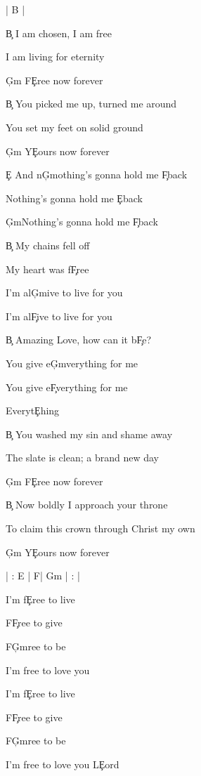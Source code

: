 \documentclass[9pt]{extarticle}
\begin{document}
\bsong

\bi
| B |
\ei

\bv
\c{B} I am chosen, I am free

I am living for eternity

\c{G\s m} F\c{E}ree now forever
\ev

\bv
\c{B} You picked me up, turned me around

You set my feet on solid ground

\c{G\s m} Y\c{E}ours now forever
\ev

\bp
\c{E} And n\c{G\s m}othing's gonna hold me \c{F\s }back

Nothing's gonna hold me \c{E}back

\c{G\s m}Nothing's gonna hold me \c{F\s }back
\ep

\bc
\c{B} My chains fell off

My heart was f\c{F\s }ree

I'm al\c{G\s m}ive to live for you

I'm al\c{F\s }ive to live for you



\c{B} Amazing Love, how can it b\c{F\s }e?

You give e\c{G\s m}verything for me

You give e\c{F\s }verything for me

Everyt\c{E}hing
\ec

\bv
\c{B} You washed my sin and shame away

The slate is clean; a brand new day

\c{G\s m} F\c{E}ree now forever
\ev

\bv
\c{B} Now boldly I approach your throne

To claim this crown through Christ my own

\c{G\s m} Y\c{E}ours now forever
\ev



\bin
| : E | F\s  | G\s m | : |
\ein

\bb[2]
I'm f\c{E}ree to live

F\c{F\s }ree to give

F\c{G\s m}ree to be

I'm free to love you
\eb

\bb
I'm f\c{E}ree to live

F\c{F\s }ree to give

F\c{G\s m}ree to be

I'm free to love you L\c{E}ord
\eb


\esong
\end{document}
